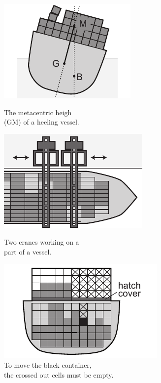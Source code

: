 \begin{figure}[pos=htbp]
	\centering
	\begin{minipage}{.32\textwidth}
  		\includegraphics{figures/GM.pdf}
  		\caption{The metacentric heigh\\ (GM) of a heeling vessel.}
  		\label{fig:GMA}
	\end{minipage}%
	\begin{minipage}{.34\textwidth}
  		\includegraphics{figures/cranes.pdf}
  		\caption{Two cranes working on a\\ part of a vessel.}
  		\label{fig:cranes}
	\end{minipage}%
	\begin{minipage}{.34\textwidth}
  		\includegraphics{figures/overstow.pdf}
		\caption{To move the black container,\\ the crossed out cells must be empty.}
  		\label{fig:overstowA}
	\end{minipage}
\end{figure}


